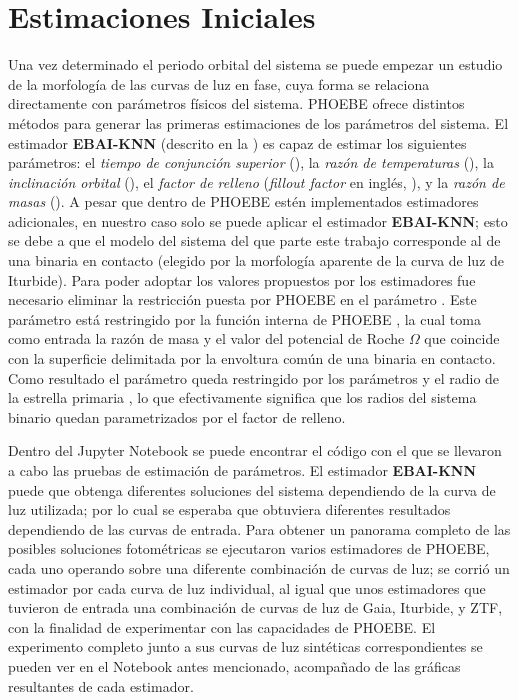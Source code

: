 \section{Estimaciones Iniciales}

Una vez determinado el periodo orbital del sistema se puede empezar un estudio
de la morfología de las curvas de luz en fase, cuya forma se relaciona
directamente con parámetros físicos del sistema. PHOEBE ofrece distintos métodos
para generar las primeras estimaciones de los parámetros del sistema. El
estimador \textbf{EBAI-KNN} (descrito en la
) es capaz de estimar
los siguientes parámetros: el \textit{tiempo de conjunción superior}
(), la \textit{razón de temperaturas} (), la
\textit{inclinación orbital} (), el \textit{factor de relleno}
(\textit{fillout factor} en inglés, ), y la \textit{razón
de masas} (). A pesar que dentro de PHOEBE estén implementados
estimadores adicionales, en nuestro caso solo se puede aplicar el estimador 
\textbf{EBAI-KNN};
esto se debe a que el modelo del sistema del que parte este trabajo corresponde
al de una binaria en contacto (elegido por la morfología aparente de la curva de
luz de Iturbide). Para poder adoptar los valores propuestos por los estimadores
fue necesario eliminar la restricción puesta por PHOEBE en el parámetro
. Este parámetro está restringido por la función interna
de PHOEBE , la cual toma como entrada la razón de
masa  y el valor del potencial de Roche $\Omega$ que coincide con la
superficie delimitada por la envoltura común de una binaria en contacto. Como
resultado el parámetro  queda restringido por los
parámetros  y el radio de la estrella primaria
, lo que efectivamente significa que los radios del sistema binario
quedan parametrizados por el factor de relleno. 

Dentro del Jupyter Notebook
\href{https://github.com/KnightIV/UANL_MAPTA_PlanObservaciones/blob/main/analisis/phoebe_model/estimations/ebai-default.ipynb}{}
se puede encontrar el código con el que se llevaron a cabo las pruebas de
estimación de parámetros. El estimador \textbf{EBAI-KNN} puede que obtenga
diferentes soluciones del sistema dependiendo de la curva de luz utilizada; por
lo cual se esperaba que obtuviera diferentes resultados dependiendo de las curvas
de entrada. Para obtener un panorama completo de las posibles soluciones
fotométricas se ejecutaron varios estimadores de PHOEBE, cada uno operando sobre
una diferente combinación de curvas de luz; se corrió un estimador por cada
curva de luz individual, al igual que unos estimadores que tuvieron de entrada
una combinación de curvas de luz de Gaia, Iturbide, y ZTF, con la finalidad de
experimentar con las capacidades de PHOEBE. El experimento completo junto a sus
curvas de luz sintéticas correspondientes se pueden ver en el Notebook
antes mencionado, acompañado de las gráficas resultantes de cada estimador.

